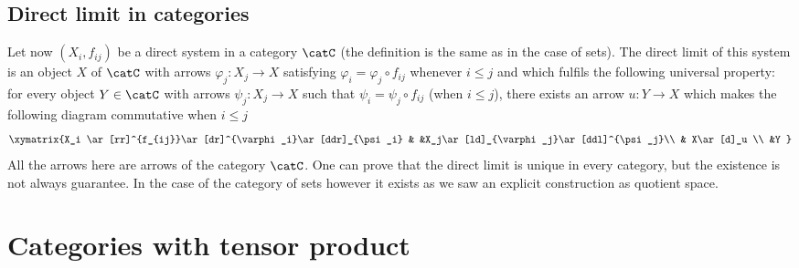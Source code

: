 \subsection{Direct limit in categories}

Let now $(X_i,f_{ij})$ be a direct system in a category $\catC$ (the definition is the same as in the case of sets). The direct limit of this system is an object $X$ of $\catC$ with arrows $\varphi_j\colon X_j\to X$ satisfying $\varphi_i=\varphi_j\circ f_{ij}$ whenever $i\leq j$ and which fulfils the following universal property: for every object $Y\in\catC$ with arrows $\psi_j\colon X_j\to X$ such that $\psi_i=\psi_j\circ f_{ij}$ (when $i\leq j$), there exists an arrow $u\colon Y\to X$ which makes the following diagram commutative when $i\leq j$
\begin{equation}
	\xymatrix{%
	X_i \ar[rr]^{f_{ij}}\ar[dr]^{\varphi_i}\ar[ddr]_{\psi_i}		&		&X_j\ar[ld]_{\varphi_j}\ar[ddl]^{\psi_j}\\
	& X\ar[d]_u	\\
	&Y
	}
\end{equation}
All the arrows here are arrows of the category $\catC$. One can prove that the direct limit is unique in every category, but the existence is not always guarantee. In the case of the category of sets however it exists as we saw an explicit construction as quotient space.

\section{Categories with tensor product}

